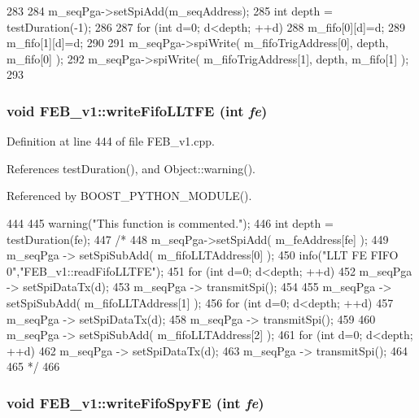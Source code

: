\begin{DoxyCode}
283                          {
284   m_seqPga->setSpiAdd(m_seqAddress);
285   int depth = testDuration(-1);
286  
287   for (int d=0; d<depth; ++d){
288     m_fifo[0][d]=d;
289     m_fifo[1][d]=d;
290   }
291   m_seqPga->spiWrite( m_fifoTrigAddress[0], depth, m_fifo[0] );
292   m_seqPga->spiWrite( m_fifoTrigAddress[1], depth, m_fifo[1] );
293 }
\end{DoxyCode}
\hypertarget{classFEB__v1_a9dbedaebc2e3569e8b5fc0be782dbce3}{
\subsubsection[{writeFifoLLTFE}]{\setlength{\rightskip}{0pt plus 5cm}void FEB\_\-v1::writeFifoLLTFE (int {\em fe})}}
\label{classFEB__v1_a9dbedaebc2e3569e8b5fc0be782dbce3}


Definition at line 444 of file FEB\_\-v1.cpp.

References testDuration(), and Object::warning().

Referenced by BOOST\_\-PYTHON\_\-MODULE().


\begin{DoxyCode}
444                                   {
445   warning("This function is commented.");
446   int depth = testDuration(fe);
447   /*
448   m_seqPga->setSpiAdd( m_feAddress[fe] );
449   m_seqPga -> setSpiSubAdd( m_fifoLLTAddress[0] );  
450   info("LLT FE FIFO 0","FEB_v1::readFifoLLTFE");        
451   for (int d=0; d<depth; ++d){ 
452     m_seqPga -> setSpiDataTx(d);
453     m_seqPga -> transmitSpi();
454   }
455   m_seqPga -> setSpiSubAdd( m_fifoLLTAddress[1] );
456   for (int d=0; d<depth; ++d){ 
457     m_seqPga -> setSpiDataTx(d);
458     m_seqPga -> transmitSpi();
459   }
460   m_seqPga -> setSpiSubAdd( m_fifoLLTAddress[2] );
461   for (int d=0; d<depth; ++d){ 
462     m_seqPga -> setSpiDataTx(d);
463     m_seqPga -> transmitSpi();
464     }
465 */
466 }
\end{DoxyCode}
\hypertarget{classFEB__v1_a0fd77cbaae9ae853e5c4dfc81b4462a5}{
\subsubsection[{writeFifoSpyFE}]{\setlength{\rightskip}{0pt plus 5cm}void FEB\_\-v1::writeFifoSpyFE (int {\em fe})}}
\label{classFEB__v1_a0fd77cbaae9ae853e5c4dfc81b4462a5}


